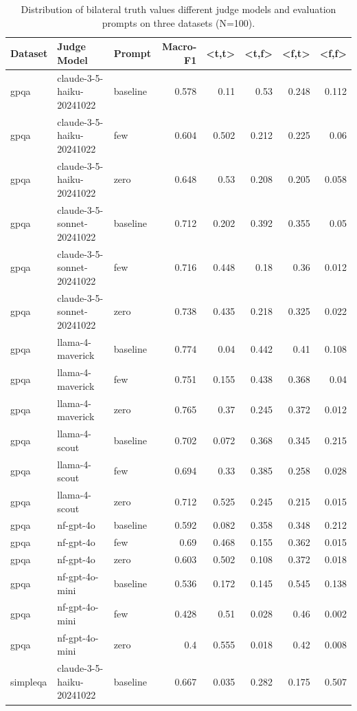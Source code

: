 \begin{table}[htbp]
\caption{Distribution of bilateral truth values different judge models and evaluation prompts on three datasets (N=100).}
\label{tab:exptvdist}
\begin{tabular}{lllrrrrr}
\toprule
Dataset & Judge Model & Prompt & Macro-F1 & <t,t> & <t,f> & <f,t> & <f,f> \\
\midrule
gpqa & claude-3-5-haiku-20241022 & baseline & 0.578 & 0.11 & 0.53 & 0.248 & 0.112 \\
gpqa & claude-3-5-haiku-20241022 & few & 0.604 & 0.502 & 0.212 & 0.225 & 0.06 \\
gpqa & claude-3-5-haiku-20241022 & zero & 0.648 & 0.53 & 0.208 & 0.205 & 0.058 \\
gpqa & claude-3-5-sonnet-20241022 & baseline & 0.712 & 0.202 & 0.392 & 0.355 & 0.05 \\
gpqa & claude-3-5-sonnet-20241022 & few & 0.716 & 0.448 & 0.18 & 0.36 & 0.012 \\
gpqa & claude-3-5-sonnet-20241022 & zero & 0.738 & 0.435 & 0.218 & 0.325 & 0.022 \\
gpqa & llama-4-maverick & baseline & 0.774 & 0.04 & 0.442 & 0.41 & 0.108 \\
gpqa & llama-4-maverick & few & 0.751 & 0.155 & 0.438 & 0.368 & 0.04 \\
gpqa & llama-4-maverick & zero & 0.765 & 0.37 & 0.245 & 0.372 & 0.012 \\
gpqa & llama-4-scout & baseline & 0.702 & 0.072 & 0.368 & 0.345 & 0.215 \\
gpqa & llama-4-scout & few & 0.694 & 0.33 & 0.385 & 0.258 & 0.028 \\
gpqa & llama-4-scout & zero & 0.712 & 0.525 & 0.245 & 0.215 & 0.015 \\
gpqa & nf-gpt-4o & baseline & 0.592 & 0.082 & 0.358 & 0.348 & 0.212 \\
gpqa & nf-gpt-4o & few & 0.69 & 0.468 & 0.155 & 0.362 & 0.015 \\
gpqa & nf-gpt-4o & zero & 0.603 & 0.502 & 0.108 & 0.372 & 0.018 \\
gpqa & nf-gpt-4o-mini & baseline & 0.536 & 0.172 & 0.145 & 0.545 & 0.138 \\
gpqa & nf-gpt-4o-mini & few & 0.428 & 0.51 & 0.028 & 0.46 & 0.002 \\
gpqa & nf-gpt-4o-mini & zero & 0.4 & 0.555 & 0.018 & 0.42 & 0.008 \\
simpleqa & claude-3-5-haiku-20241022 & baseline & 0.667 & 0.035 & 0.282 & 0.175 & 0.507 \\

\end{tabular}
\end{table}
